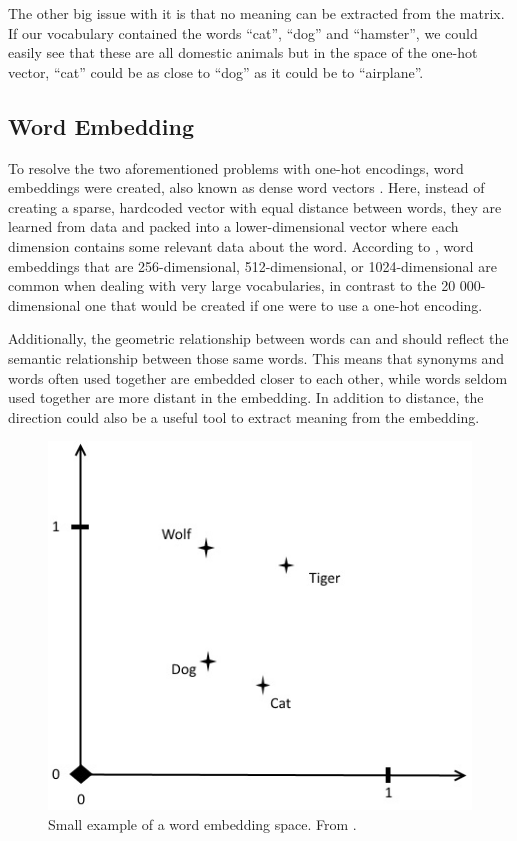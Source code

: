 \documentclass[nofilelist]{cslthse-msc}
\begin{document}
The other big issue with it is that no meaning can be extracted from the matrix. If our vocabulary contained the words ``cat'', ``dog'' and ``hamster'', we could easily see that these are all domestic animals but in the space of the one-hot vector, ``cat'' could be as close to ``dog'' as it could be to ``airplane''. 

\subsection{Word Embedding}
To resolve the two aforementioned problems with one-hot encodings, word embeddings were created, also known as dense word vectors \citep{neuralnetworkmethods}. 
Here, instead of creating a sparse, hardcoded vector with equal distance between words, they are learned from data and packed into a lower-dimensional vector where each dimension contains some relevant data about the word. According to \citet{franoischollet2017learning}, word embeddings that are 256-dimensional, 512-dimensional, or 1024-dimensional are common when dealing with very large vocabularies, in contrast to the 20 000-dimensional one that would be created if one were to use a one-hot encoding. 

Additionally, the geometric relationship between words can and should reflect the semantic relationship between those same words. This means that synonyms and words often used together are embedded closer to each other, while words seldom used together are more distant in the embedding. In addition to distance, the direction could also be a useful tool to extract meaning from the embedding. %

\begin{figure}[!ht]
\centering
\includegraphics[scale=0.8]{msccls/explanatory_images/embedding_direction.png} 
\caption{Small example of a word embedding space. From \citet{franoischollet2017learning}.}
\label{fig:direction}
\end{figure}
\end{document}
